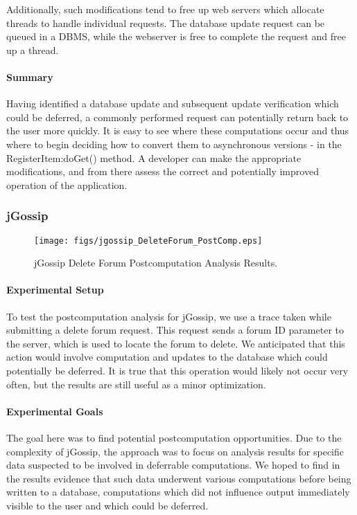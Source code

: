 \documentclass[msc,oneside]{ubcthesis}
\begin{document}
Additionally, such modifications tend to free up web servers which allocate threads to handle individual requests. The database update request can be queued in a DBMS, while the webserver is free to complete the request and free up a thread.

\paragraph{Summary}
Having identified a database update and subsequent update verification which could be deferred, a commonly performed request can potentially return back to the user more quickly. It is easy to see where these computations occur and thus where to begin deciding how to convert them to asynchronous versions - in the RegisterItem:doGet() method. A developer can make the appropriate modifications, and from there assess the correct and potentially improved operation of the application.

\subsubsection{jGossip} 

\begin{sidewaysfigure}
\centering
\scalebox{0.5}
{\texttt{[image: figs/jgossip\_DeleteForum\_PostComp.eps]}}
\caption{jGossip Delete Forum Postcomputation Analysis Results.} 
\label{fig:deleteforumpostcomputation}
\end{sidewaysfigure}

\paragraph{Experimental Setup}
To test the postcomputation analysis for jGossip, we use a trace taken while submitting a delete forum request. This request sends a forum ID parameter to the server, which is used to locate the forum to delete. We anticipated that this action would involve computation and updates to the database which could potentially be deferred. It is true that this operation would likely not occur very often, but the results are still useful as a minor optimization. \\

\paragraph{Experimental Goals}
The goal here was to find potential postcomputation opportunities. Due to the complexity of jGossip, the approach was to focus on analysis results for specific data suspected to be involved in deferrable computations. We hoped to find in the results evidence that such data underwent various computations before being written to a database, computations which did not influence output immediately visible to the user and which could be deferred.
\end{document}
